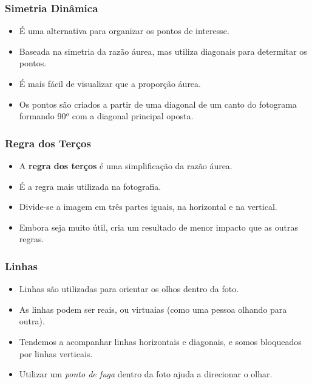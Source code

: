 
\begin{frame}
    \frametitle{Simetria Dinâmica}
    \begin{itemize}
      \item É uma alternativa para organizar os pontos de interesse.
      \item Baseada na simetria da razão áurea, mas utiliza diagonais para determitar os pontos.
      \item É mais fácil de visualizar que a proporção áurea.
      \item Os pontos são criados a partir de uma diagonal de um canto do fotograma formando 90$^o$
      com a diagonal principal oposta.
    \end{itemize}
\end{frame}


\begin{frame}
    \frametitle{Regra dos Terços}
    \begin{itemize}
      \item A \textbf{regra dos terços} é uma simplificação da razão áurea.
      \item É a regra mais utilizada na fotografia.
      \item Divide-se a imagem em três partes iguais, na horizontal e na vertical.
      \item Embora seja muito útil, cria um resultado de menor impacto que as outras regras.
    \end{itemize}
\end{frame}


\begin{frame}
    \frametitle{Linhas}
    \begin{itemize}
      \item Linhas são utilizadas para orientar os olhos dentro da foto.
      \item As linhas podem ser reais, ou virtuaias (como uma pessoa olhando para outra).
      \item Tendemos a acompanhar linhas horizontais e diagonais, e somos bloqueados por linhas verticais.
      \item Utilizar um \textit{ponto de fuga} dentro da foto ajuda a direcionar o olhar.
    \end{itemize}
\end{frame}

